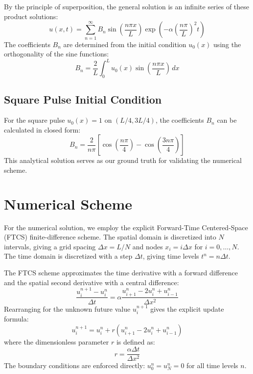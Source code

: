 \documentclass[11pt, a4paper]{article}
\begin{document}
By the principle of superposition, the general solution is an infinite series of these product solutions:
\begin{equation}
    u(x, t) = \sum_{n=1}^{\infty} B_n \sin\left(\frac{n\pi x}{L}\right) \exp\left(-\alpha \left(\frac{n\pi}{L}\right)^2 t\right)
    \label{eq:analytical}
\end{equation}
The coefficients $B_n$ are determined from the initial condition $u_0(x)$ using the orthogonality of the sine functions:
\begin{equation}
    B_n = \frac{2}{L} \int_0^L u_0(x) \sin\left(\frac{n\pi x}{L}\right) \, dx
    \label{eq:fourier}
\end{equation}

\subsection{Square Pulse Initial Condition}
For the square pulse $u_0(x) = 1$ on $(L/4, 3L/4)$, the coefficients $B_n$ can be calculated in closed form:
\begin{equation}
    B_n = \frac{2}{n\pi} \left[ \cos\left(\frac{n\pi}{4}\right) - \cos\left(\frac{3n\pi}{4}\right) \right]
\end{equation}
This analytical solution serves as our ground truth for validating the numerical scheme.

\section{Numerical Scheme}

For the numerical solution, we employ the explicit Forward-Time Centered-Space (FTCS) finite-difference scheme. The spatial domain is discretized into $N$ intervals, giving a grid spacing $\Delta x = L/N$ and nodes $x_i = i\Delta x$ for $i=0, \dots, N$. The time domain is discretized with a step $\Delta t$, giving time levels $t^n = n\Delta t$.

The FTCS scheme approximates the time derivative with a forward difference and the spatial second derivative with a central difference:
\[
    \frac{u_i^{n+1} - u_i^n}{\Delta t} = \alpha \frac{u_{i+1}^n - 2u_i^n + u_{i-1}^n}{\Delta x^2}
\]
Rearranging for the unknown future value $u_i^{n+1}$ gives the explicit update formula:
\begin{equation}
    u_i^{n+1} = u_i^n + r \left(u_{i+1}^n - 2u_i^n + u_{i-1}^n\right)
    \label{eq:ftcs}
\end{equation}
where the dimensionless parameter $r$ is defined as:
\[
    r = \frac{\alpha \Delta t}{\Delta x^2}
\]
The boundary conditions are enforced directly: $u_0^n = u_N^n = 0$ for all time levels $n$.
\end{document}
